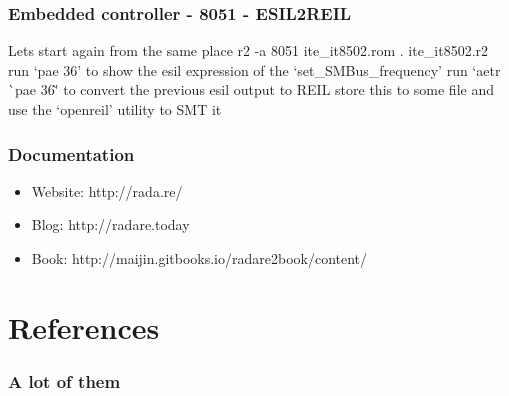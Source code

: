 \documentclass[10pt,pdf,utf8,english,compress,hyperref={unicode}]{beamer}
\begin{document}
\begin{frame}[fragile]
  \frametitle{Embedded controller - 8051 - ESIL2REIL}
  \center Lets start again from the same place
  \center r2 -a 8051 ite\_it8502.rom
  \center . ite\_it8502.r2
  \center run `pae 36' to show the esil expression of the `set\_SMBus\_frequency'
  \center run `aetr \`{}pae 36\`' to convert the previous esil output to REIL
  \center store this to some file and use the `openreil' utility to SMT it
\end{frame}

\begin{frame}[fragile]
  \frametitle{Documentation}
    \begin{itemize}
    \item \alert{Website:} http://rada.re/
    \item \alert{Blog:} http://radare.today
    \item \alert{Book:} http://maijin.gitbooks.io/radare2book/content/
    \end{itemize}
\end{frame}

\ifxetex
\else
\section{References}
\begin{frame}[allowframebreaks]
	\frametitle{A lot of them}
	\printbibliography
\end{frame}
\fi
\end{document}
